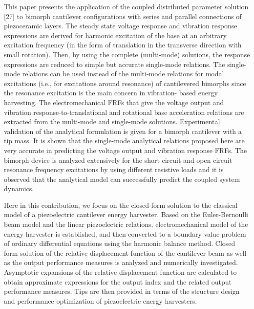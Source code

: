 \documentclass{article}
\begin{document}
This paper presents the application of the coupled distributed parameter solution [27] to bimorph cantilever configurations with series and parallel connections of piezoceramic layers. The steady state voltage response and vibration response expressions are derived for harmonic excitation of the base at an arbitrary excitation frequency (in the form of translation in the transverse direction with small rotation). Then, by using the complete (multi-mode) solutions, the response expressions are reduced to simple but accurate single-mode relations. The single-mode relations can be used instead of the multi-mode relations for modal excitations (i.e., for excitations around resonance) of cantilevered bimorphs since the resonance excitation is the main concern in vibration- based energy harvesting. The electromechanical FRFs that give the voltage output and vibration response-to-translational and rotational base acceleration relations are extracted from the multi-mode and single-mode solutions. Experimental validation of the analytical formulation is given for a bimorph cantilever with a tip mass. It is shown that the single-mode analytical relations proposed here are very accurate in predicting the voltage output and vibration response FRFs. The bimorph device is analyzed extensively for the short circuit and open circuit resonance frequency excitations by using different resistive loads and it is observed that the analytical model can successfully predict the coupled system dynamics.



Here in this contribution, we focus on the closed-form solution to the classical model of a piezoelectric cantilever energy harvester. Based on the Euler-Bernoulli beam model and the linear piezoelectric relations, electromechanical model of the energy harvester is established, and then converted to a boundary value problem of ordinary differential equations using the harmonic balance method. Closed form solution of the relative displacement function of the cantilever beam as well as the output performance measures is analyzed and numerically investigated. Asymptotic expansions of the relative displacement function are calculated to obtain approximate expressions for the output index and the related output performance measures. Tips are then provided in terms of the structure design and performance optimization of piezoelectric energy harvesters. 
\end{document}
